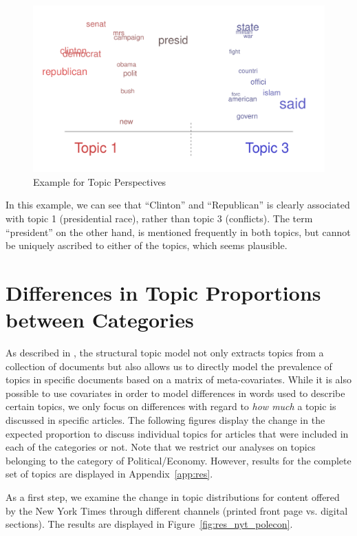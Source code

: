 \documentclass[12pt]{article}
\begin{document}
\begin{doublespace}
\begin{figure}
\caption{Example for Topic Perspectives}\label{fig:perspectives}
\includegraphics[width=\textwidth]{../calc/fig/perspective} 
\end{figure}

In this example, we can see that ``Clinton'' and ``Republican'' is clearly associated with topic 1 (presidential race), rather than topic 3 (conflicts). The term ``president'' on the other hand, is mentioned frequently in both topics, but cannot be uniquely ascribed to either of the topics, which seems plausible.


\section{Differences in Topic Proportions between Categories}

As described in \citet{roberts2014structural}, the structural topic model not only extracts topics from a collection of documents but also allows us to directly model the prevalence of topics in specific documents based on a matrix of meta-covariates. While it is also possible to use covariates in order to model differences in words used to describe certain topics, we only focus on differences with regard to \textit{how much} a topic is discussed in specific articles. The following figures display the change in the expected proportion to discuss individual topics for articles that were included in each of the categories or not. Note that we restrict our analyses on topics belonging to the category of Political/Economy. However, results for the complete set of topics are displayed in Appendix~\ref{app:res}.

As a first step, we examine the change in topic distributions for content offered by the New York Times through different channels (printed front page vs. digital sections). The results are displayed in Figure~\ref{fig:res_nyt_polecon}.


\end{doublespace}
\end{document}
